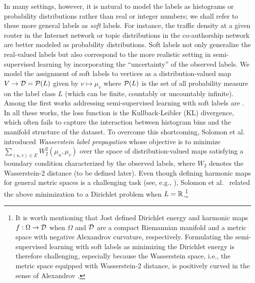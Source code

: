 \documentclass[letterpaper]{article} %
\begin{document}
In many settings, however, it is natural to model the labels as histograms or probability distributions rather than real or integer numbers; we shall refer to these more general labels as \textit{soft} labels. For instance, the traffic density at a given router in the Internet network or topic distributions in the co-authorship network are better modeled as probability distributions. Soft labels not only generalize the real-valued labels but also correspond to the more realistic setting in semi-supervised learning by incorporating the ``uncertainty'' of the observed labels. We model the assignment of soft labels to vertices as a distribution-valued map $V\to \D=\P(L)$ given by $v\mapsto \mu_v$ where $\P(L)$ is the set of all probability measure on the label class $L$ (which can be finite, countably or uncountably infinite). Among the first works addressing semi-supervised learning with soft labels are \cite{Distribution_Propagation1, Distribution_Propagation2, SSL_Measure_Propagation}.  In all these works, the loss function is the Kullback-Leibler (KL) divergence, which often fails to capture the interaction between histogram bins and the manifold structure of the dataset. To overcome this shortcoming, Solomon et al.\ \cite{Solomon:2014} introduced \textit{Wasserstein label propagation} whose objective is to minimize $\sum_{(u, v)\in E}W_2^2(\mu_u,\mu_v)$ over the space of distribution-valued maps satisfying a boundary condition characterized by the observed labels, where $W_2$ denotes the Wasserstein-2 distance (to be defined later). Even though defining harmonic maps for general metric spaces is a challenging task (see, e.g., \cite{Dirichlet_Wasserstein}), Solomon et al.\ \cite{Solomon:2014} related the above minimization to a Dirichlet problem when $L=\R$.\footnote{It is worth mentioning that Jost \cite{Jost} defined Dirichlet energy and  harmonic maps $f: \Omega\to \D$ when $\Omega$ and $\D$ are a compact Riemannian manifold and a metric space with negative Alexandrov curvature, respectively.  Formulating the semi-supervised learning with soft labels as minimizing the Dirichlet energy is therefore challenging, especially because the Wasserstein space, i.e.,  the metric space equipped with Wasserstein-2 distance, is positively curved in the sense of Alexandrov \cite [Section 7.3]{ambrosio2005gradient}. }
\end{document}
